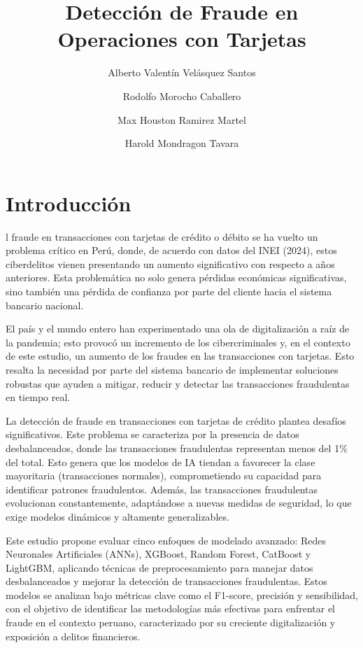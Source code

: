 \documentclass[9pt,a4paper,twoside]{rho-class/rho}
\title{ Detección de Fraude en Operaciones con Tarjetas}
\author[,$\dagger$]{Alberto Valentín Velásquez Santos}
\author[,$\dagger$]{Rodolfo Morocho Caballero}
\author[,$\dagger$]{Max Houston Ramirez Martel}
\author[,$\dagger$]{Harold Mondragon Tavara}
\affil[$\dagger$]{Estos autores contribuyeron igualmente a este trabajo.}
\begin{document}
	
    \maketitle
    \section{Introducción}

        l fraude en transacciones con tarjetas de crédito o débito se ha vuelto un problema crítico en Perú, donde, de acuerdo con datos del INEI (2024), estos ciberdelitos vienen presentando un aumento significativo con respecto a años anteriores. Esta problemática no solo genera pérdidas económicas significativas, sino también una pérdida de confianza por parte del cliente hacia el sistema bancario nacional.

        El país y el mundo entero han experimentado una ola de digitalización a raíz de la pandemia; esto provocó un incremento de los cibercriminales y, en el contexto de este estudio, un aumento de los fraudes en las transacciones con tarjetas. Esto resalta la necesidad por parte del sistema bancario de implementar soluciones robustas que ayuden a mitigar, reducir y detectar las transacciones fraudulentas en tiempo real. 
        
        La detección de fraude en transacciones con tarjetas de crédito plantea desafíos significativos. Este problema se caracteriza por la presencia de datos desbalanceados, donde las transacciones fraudulentas representan menos del 1\% del total. Esto genera que los modelos de IA tiendan a favorecer la clase mayoritaria (transacciones normales), comprometiendo su capacidad para identificar patrones fraudulentos. Además, las transacciones fraudulentas evolucionan constantemente, adaptándose a nuevas medidas de seguridad, lo que exige modelos dinámicos y altamente generalizables. 
        
        Este estudio propone evaluar cinco enfoques de modelado avanzado: Redes Neuronales Artificiales (ANNs), XGBoost, Random Forest, CatBoost y LightGBM, aplicando técnicas de preprocesamiento para manejar datos desbalanceados y mejorar la detección de transacciones fraudulentas. Estos modelos se analizan bajo métricas clave como el F1-score, precisión y sensibilidad, con el objetivo de identificar las metodologías más efectivas para enfrentar el fraude en el contexto peruano, caracterizado por su creciente digitalización y exposición a delitos financieros.
        
\end{document}
